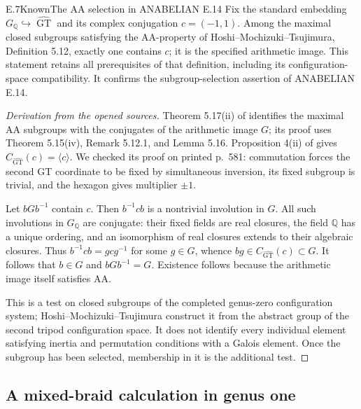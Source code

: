 \begin{result}{E.7}{Known}{The AA selection in ANABELIAN E.14}
Fix the standard embedding $G_{\mathbb Q}\hookrightarrow\widehat{
\operatorname{GT}}$ and its complex conjugation $c=(-1,1)$.
Among the maximal closed subgroups satisfying the AA-property of
Hoshi--Mochizuki--Tsujimura, Definition 5.12, exactly one contains $c$;
it is the specified arithmetic image.  This statement retains all
prerequisites of that definition, including its configuration-space
compatibility.  It confirms the subgroup-selection assertion of
ANABELIAN E.14.
\end{result}
\begin{proof}[Derivation from the opened sources]
Theorem 5.17(ii) of \cite{ET_HMT2025} identifies the maximal AA
subgroups with the conjugates of the arithmetic image $G$; its
proof uses Theorem 5.15(iv), Remark 5.12.1, and Lemma 5.16.
Proposition 4(ii) of \cite{ET_LS1997} gives
$C_{\widehat{\operatorname{GT}}}(c)=\langle c\rangle$.
We checked its proof on printed p.~581: commutation forces the
second GT coordinate to be fixed by simultaneous inversion, its
fixed subgroup is trivial, and the hexagon gives multiplier $\pm1$.

Let $bGb^{-1}$ contain $c$.  Then $b^{-1}cb$ is a nontrivial
involution in $G$.  All such involutions in $G_{\mathbb Q}$ are
conjugate: their fixed fields are real closures, the field $\mathbb Q$
has a unique ordering, and an isomorphism of real closures extends
to their algebraic closures.  Thus $b^{-1}cb=g c g^{-1}$ for some
$g\in G$, whence $bg\in C_{\widehat{\operatorname{GT}}}(c)
\subset G$.  It follows that $b\in G$ and $bGb^{-1}=G$.
Existence follows because the arithmetic image itself satisfies AA.

This is a test on closed subgroups of the completed genus-zero
configuration system; Hoshi--Mochizuki--Tsujimura construct it from
the abstract group of the second tripod configuration space.  It
does not identify every individual element satisfying inertia and
permutation conditions with a Galois element.  Once the subgroup
has been selected, membership in it is the additional test.
\end{proof}

\subsection{A mixed-braid calculation in genus one}

